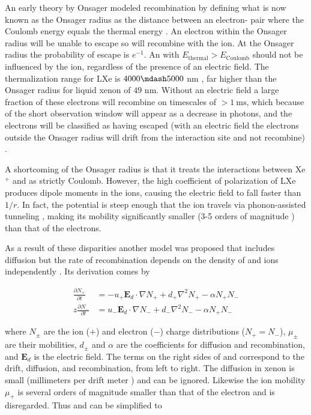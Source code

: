 An early theory by Onsager modeled recombination by defining what is now known as the Onsager radius as the distance between an
electron- pair where the Coulomb energy equals the \electron thermal energy .  An electron within the
Onsager radius will be unable to escape so will recombine with the ion.  At the Onsager radius the probability of escape is $e^{-1}$.  An
\electron
with $E_{\mathrm{thermal}} > E_{\mathrm{Coulomb}}$ should not be influenced by the ion, regardless of the presence of an electric
field.  The thermalization range for LXe is $4000 \mdash 5000$ nm , far higher than the Onsager radius for liquid
xenon of $49$ nm.  Without an electric field a large fraction of these electrons will recombine on
timescales of $> 1\ \mathrm{ms}$, which because of the short observation window will appear as a decrease in photons, and the electrons
will be classified as having escaped (with an electric field the electrons outside the Onsager radius will drift from the interaction site
and not recombine) .

A shortcoming of the Onsager radius is that it treats the interactions between Xe$^{+}$ and \electron as strictly Coulomb.  However,
the high coefficient of polarization of LXe produces dipole moments in the ions, causing the electric field to fall faster than
$1/r$.  In fact, the potential is steep enough that the ion travels via phonon-assisted tunneling , making its
mobility significantly smaller (3-5 orders of magnitude ) than that of the electrons.

As a result of these disparities another model was proposed that includes diffusion but the rate of
recombination depends on
the density of \electron and ions independently .  Its derivation comes by

\begin{subequations}
\begin{align}
\frac{\partial N_{+}}{\partial t} &= -u_{+} \mathbf{E}_d \cdot \nabla N_{+} + d_{+} \nabla^{2} N_{+} - \alpha N_{+} N_{-}
\label{eq:diff_plus} \\z
\frac{\partial N_{-}}{\partial t} &= u_{-} \mathbf{E}_d \cdot \nabla N_{-} + d_{-} \nabla^{2} N_{-} - \alpha N_{+} N_{-}
\label{eq:diff_minus}
\end{align}
\end{subequations}

\noindent where $N_{\pm}$ are the ion ($+$) and electron ($-$) charge distributions ($N_+ = N_-$), $\mu_{\pm}$ are their mobilities,
$d_{\pm}$ and $\alpha$
are the coefficients for diffusion and recombination, and $\mathbf{E}_d$ is the electric field.  The terms on the right sides of
 and  correspond to the drift, diffusion, and recombination, from left to right.  The
diffusion in xenon is small (millimeters per drift meter ) and can be ignored.  Likewise the ion mobility $\mu_{+}$
is several orders of magnitude smaller than that
of the electron and is disregarded.  Thus  and  can be simplified to

